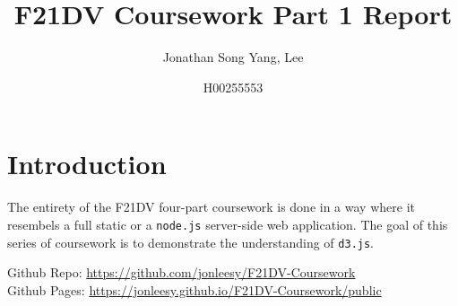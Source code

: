 \documentclass{scrreprt}
\title{F21DV Coursework Part 1 Report}
\author{Jonathan Song Yang, Lee}
\date{H00255553}
\begin{document}
\maketitle

\newpage
\tableofcontents


\newpage
\chapter{Introduction}
The entirety of the F21DV four-part coursework is done in a way where it resembels
a full static or a \verb|node.js| server-side web application. The goal of this
series of coursework is to demonstrate the understanding of \verb|d3.js|.\\
\par Github Repo: \href{https://github.com/jonleesy/F21DV-Coursework}{https://github.com/jonleesy/F21DV-Coursework}\\
Github Pages: \href{https://jonleesy.github.io/F21DV-Coursework/public}{https://jonleesy.github.io/F21DV-Coursework/public}
\end{document}
